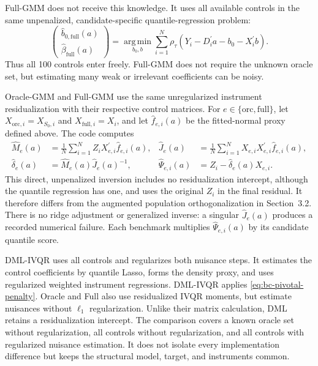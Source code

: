 Full-GMM does not receive this knowledge. It uses all available controls in the same unpenalized, candidate-specific quantile-regression problem:
\begin{equation}
    \begin{pmatrix}
        \widehat b_{0,\mathrm{full}}(a)\\
        \widehat\beta_{\mathrm{full}}(a)
    \end{pmatrix}
    =
    \operatorname*{arg\,min}_{b_0,b}
    \sum_{i=1}^{N}
    \rho_{\tau}\!\left(
        Y_i-D_i^{\prime}a-b_0-X_i^{\prime}b
    \right).
    \label{eq:full-beta}
\end{equation}
Thus all 100 controls enter freely. Full-GMM does not require the unknown oracle set, but estimating many weak or irrelevant coefficients can be noisy.

Oracle-GMM and Full-GMM use the same unregularized instrument residualization with their respective control matrices. For $e\in\{\mathrm{orc},\mathrm{full}\}$, let $X_{\mathrm{orc},i}=X_{S_0,i}$ and $X_{\mathrm{full},i}=X_i$, and let $\widehat f_{e,i}(a)$ be the fitted-normal proxy defined above. The code computes
\begin{equation}
    \begin{aligned}
        \widehat M_e(a)
        &=\frac{1}{N}\sum_{i=1}^{N}
          Z_iX_{e,i}^{\prime}\widehat f_{e,i}(a),&
        \widehat J_e(a)
        &=\frac{1}{N}\sum_{i=1}^{N}
          X_{e,i}X_{e,i}^{\prime}\widehat f_{e,i}(a),\\
        \widehat\delta_e(a)
        &=\widehat M_e(a)\widehat J_e(a)^{-1},&
        \widehat\Psi_{e,i}(a)
        &=Z_i-\widehat\delta_e(a)X_{e,i}.
    \end{aligned}
    \label{eq:benchmark-residualization}
\end{equation}
This direct, unpenalized inversion includes no residualization intercept, although the quantile regression has one, and uses the original $Z_i$ in the final residual. It therefore differs from the augmented population orthogonalization in Section~3.2. There is no ridge adjustment or generalized inverse: a singular $\widehat J_e(a)$ produces a recorded numerical failure. Each benchmark multiplies $\widehat\Psi_{e,i}(a)$ by its candidate quantile score.

DML-IVQR uses all controls and regularizes both nuisance steps. It estimates the control coefficients by quantile Lasso, forms the density proxy, and uses regularized weighted instrument regressions. DML-IVQR applies \eqref{eq:bc-pivotal-penalty}. Oracle and Full also use residualized IVQR moments, but estimate nuisances without $\ell_1$ regularization. Unlike their matrix calculation, DML retains a residualization intercept. The comparison covers a known oracle set without regularization, all controls without regularization, and all controls with regularized nuisance estimation. It does not isolate every implementation difference but keeps the structural model, target, and instruments common.

